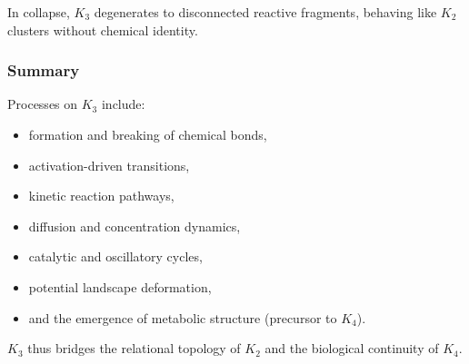 In collapse, $K_3$ degenerates to disconnected reactive fragments, 
behaving like $K_2$ clusters without chemical identity.

\subsubsection{Summary}

Processes on $K_3$ include:
\begin{itemize}
    \item formation and breaking of chemical bonds,
    \item activation-driven transitions,
    \item kinetic reaction pathways,
    \item diffusion and concentration dynamics,
    \item catalytic and oscillatory cycles,
    \item potential landscape deformation,
    \item and the emergence of metabolic structure (precursor to $K_4$).
\end{itemize}

$K_3$ thus bridges the relational topology of $K_2$ and the biological 
continuity of $K_4$.
